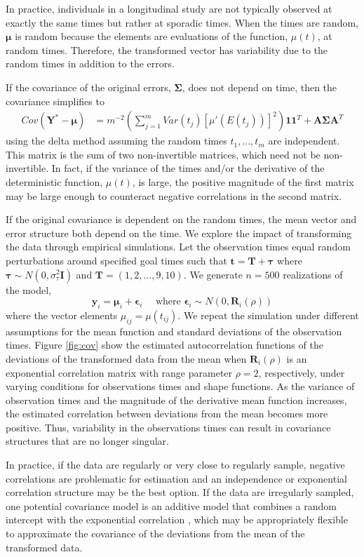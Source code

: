 \documentclass[12pt]{article}
\newcommand{\B}[0]{\mathbf}
\newcommand{\BS}[0]{\boldsymbol}
\begin{document}
In practice, individuals in a longitudinal study are not typically observed at exactly the same times but rather at sporadic times. When the times are random, $\BS\mu$ is random because the elements are evaluations of the function, $\mu(t)$, at random times. Therefore, the transformed vector has variability due to the random times in addition to the errors. 

If the covariance of the original errors, $\BS \Sigma$, does not depend on time, then the covariance simplifies to
\begin{align*}
Cov(\B Y^{*} - \BS\mu)&=m^{-2}\left(\sum^{m}_{j=1}Var(t_{j})[\mu'(E(t_{j}))]^{2}\right) \B 1\B 1^{T}  + \B A\BS\Sigma\B A^{T}
\end{align*}
using the delta method assuming the random times $t_{1},...,t_{m}$ are independent. This matrix is the sum of two non-invertible matrices, which need not be non-invertible. In fact, if the variance of the times and/or the derivative of the deterministic function, $\mu(t)$, is large, the positive magnitude of the first matrix may be large enough to counteract negative correlations in the second matrix. 

If the original covariance is dependent on the random times, the mean vector and error structure both depend on the time. We explore the impact of transforming the data through empirical simulations. Let the observation times equal random perturbations around specified goal times such that $\B t = \B T + \B \tau$ where $\B \tau\sim N(0,\sigma^{2}_{\tau}\B I)$ and $\B T = (1,2,...,9,10)$. We generate $n=500$ realizations of the model,
$$\B y_{i} = \BS\mu_{i} + \BS\epsilon_{i}\quad\text{ where }\BS\epsilon_{i}\sim N(0,\B R_{i}(\rho))$$
where the vector elements $\mu_{ij}=\mu(t_{ij})$. We repeat the simulation under different assumptions for the mean function and standard deviations of the observation times. Figure \ref{fig:cov} show the estimated autocorrelation functions of the deviations of the transformed data from the mean when  $\B R_{i}(\rho)$ is an exponential correlation matrix with range parameter $\rho=2$, respectively, under varying conditions for observations times and shape functions. As the variance of observation times and the magnitude of the derivative mean function increases, the estimated correlation between deviations from the mean becomes more positive. Thus, variability in the observations times can result in covariance structures that are no longer singular. 

In practice, if the data are regularly or very close to regularly sample, negative correlations are problematic for estimation and an independence or exponential correlation structure may be the best option. If the data are irregularly sampled, one potential covariance model is an additive model that combines a random intercept with the exponential correlation \cite{diggle2002}, which may be appropriately flexible to approximate the covariance of the deviations from the mean of the transformed data.\\
\end{document}
